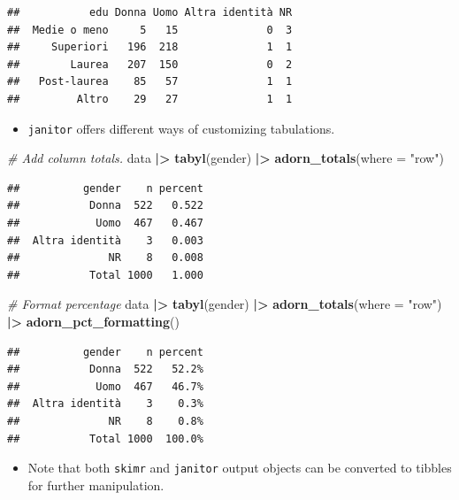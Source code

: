 \documentclass[
]{book}
\newenvironment{Shaded}{\begin{snugshade}}{\end{snugshade}}
\newcommand{\AttributeTok}[1]{\textcolor[rgb]{0.13,0.29,0.53}{#1}}
\newcommand{\CommentTok}[1]{\textcolor[rgb]{0.56,0.35,0.01}{\textit{#1}}}
\newcommand{\FunctionTok}[1]{\textcolor[rgb]{0.13,0.29,0.53}{\textbf{#1}}}
\newcommand{\NormalTok}[1]{#1}
\newcommand{\SpecialCharTok}[1]{\textcolor[rgb]{0.81,0.36,0.00}{\textbf{#1}}}
\newcommand{\StringTok}[1]{\textcolor[rgb]{0.31,0.60,0.02}{#1}}
\providecommand{\tightlist}{%
  \setlength{\itemsep}{0pt}\setlength{\parskip}{0pt}}
\begin{document}
\begin{verbatim}
##           edu Donna Uomo Altra identità NR
##  Medie o meno     5   15              0  3
##     Superiori   196  218              1  1
##        Laurea   207  150              0  2
##   Post-laurea    85   57              1  1
##         Altro    29   27              1  1
\end{verbatim}

\begin{itemize}
\tightlist
\item
  \texttt{janitor} offers different ways of customizing tabulations.
\end{itemize}

\begin{Shaded}
\begin{Highlighting}[]
\CommentTok{\# Add column totals.}
\NormalTok{data }\SpecialCharTok{|\textgreater{}} 
  \FunctionTok{tabyl}\NormalTok{(gender) }\SpecialCharTok{|\textgreater{}} 
  \FunctionTok{adorn\_totals}\NormalTok{(}\AttributeTok{where =} \StringTok{"row"}\NormalTok{)}
\end{Highlighting}
\end{Shaded}

\begin{verbatim}
##          gender    n percent
##           Donna  522   0.522
##            Uomo  467   0.467
##  Altra identità    3   0.003
##              NR    8   0.008
##           Total 1000   1.000
\end{verbatim}

\begin{Shaded}
\begin{Highlighting}[]
\CommentTok{\# Format percentage}
\NormalTok{data }\SpecialCharTok{|\textgreater{}} 
  \FunctionTok{tabyl}\NormalTok{(gender) }\SpecialCharTok{|\textgreater{}} 
  \FunctionTok{adorn\_totals}\NormalTok{(}\AttributeTok{where =} \StringTok{"row"}\NormalTok{) }\SpecialCharTok{|\textgreater{}} 
  \FunctionTok{adorn\_pct\_formatting}\NormalTok{()}
\end{Highlighting}
\end{Shaded}

\begin{verbatim}
##          gender    n percent
##           Donna  522   52.2%
##            Uomo  467   46.7%
##  Altra identità    3    0.3%
##              NR    8    0.8%
##           Total 1000  100.0%
\end{verbatim}

\begin{itemize}
\tightlist
\item
  Note that both \texttt{skimr} and \texttt{janitor} output objects can be converted to tibbles for further manipulation.
\end{itemize}
\end{document}
